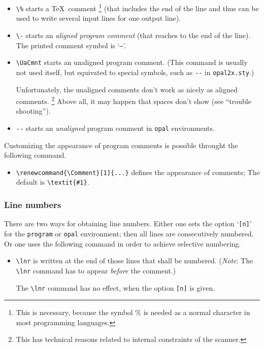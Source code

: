 \begin{itemize}
  \item \verb+\%+ starts a \TeX~comment%
    \footnote{This is necessary, because the symbol \% is needed as a normal
      character in most programming languages.} %
    (that includes the end of the line and thus can be used to write
    several input lines for one output line).
    
  \item \verb+\-+ starts an \emph{aligned program comment} (that reaches to
    the end of the line). The printed comment symbol is `\texttt{--}'.

  \item \verb+\UaCmnt+ starts an unaligned program comment. (This command
    is usually not used itself, but equivated to special symbols, such as
    \verb+--+ in \texttt{opal2x.sty}.)

    Unfortunately, the unaligned comments don't work as nicely as aligned
    comments.%
    \footnote{This has technical reasons related to internal constraints of
      the scanner.} %
    Above all, it may happen that spaces don't show (see ``trouble
    shooting'').

  \item \verb+--+ starts an \emph{unaligned} program comment in
    \texttt{opal} environments.
\end{itemize}

Customizing the appearance of program comments is possible throught the
following command.

\begin{itemize}
  \item \verb+\renewcommand{\Comment}[1]{...}+ defines the appearance of
    comments; The default is \verb+\textit{#1}+.
\end{itemize}


\subsubsection*{Line numbers}

There are two ways for obtaining line numbers. Either one sets the option
`\texttt{[n]}' for the \texttt{program} or \texttt{opal} environment; then
all lines are consecutively numbered. Or one uses the following command in
order to achieve selective numbering.

\begin{itemize}
  \item \verb+\lnr+ is written at the end of those lines that shall be
    numbered.  (\emph{Note}: The \verb=\lnr= command has to appear
    \emph{before} the comment.)
    
    The \verb+\lnr+ command has no effect, when the option \verb+[n]+ is
    given.
\end{itemize}

